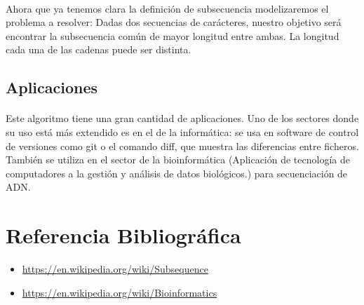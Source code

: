 \documentclass{article}
\begin{document}
		\paragraph{}
		Ahora que ya tenemos clara la definición de subsecuencia modelizaremos el problema a resolver:
		\newline
		Dadas dos secuencias de carácteres, nuestro objetivo será encontrar la subsecuencia común de mayor longitud entre ambas. La longitud cada una de las cadenas puede ser distinta.

	\subsection{Aplicaciones}
		\paragraph{}
		Este algoritmo tiene una gran cantidad de aplicaciones. Uno de los sectores donde su uso está más extendido es en el de la informática: se usa en software de control de versiones como git o el comando diff, que muestra las diferencias entre ficheros. También se utiliza en el sector de la bioinformática (Aplicación de tecnología de computadores a la gestión y análisis de datos biológicos.) para secuenciación de ADN.

\section{Referencia Bibliográfica}

	\begin{itemize}
		\item \url{https://en.wikipedia.org/wiki/Subsequence}	
		\item \url{https://en.wikipedia.org/wiki/Bioinformatics}	
		
		
		
	\end{itemize}
\end{document}
